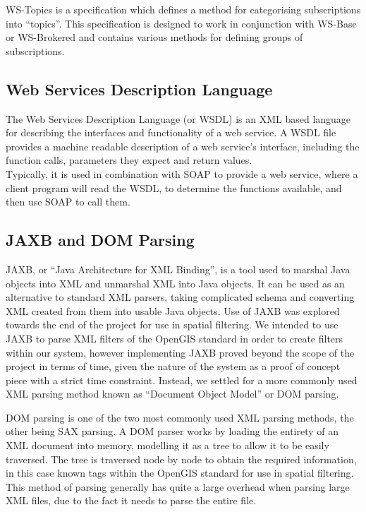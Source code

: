 \documentclass[a4paper, 12pt]{article}
\begin{document}
WS-Topics is a specification which defines a method for categorising subscriptions into ``topics''. This specification is designed to work in conjunction with WS-Base or WS-Brokered and contains various methods for defining groups of subscriptions.

\subsection{Web Services Description Language}

The Web Services Description Language (or WSDL) is an XML based language for describing the interfaces and functionality of a web service. A WSDL file provides a machine readable description of a web service's interface, including the function calls, parameters they expect and return values.\\
Typically, it is used in combination with SOAP to provide a web service, where a client program will read the WSDL, to determine the functions available, and then use SOAP to call them.

\subsection{JAXB and DOM Parsing}

JAXB, or ``Java Architecture for XML Binding'', is a tool used to marshal Java objects into XML and unmarshal XML into Java objects. It can be used as an alternative to standard XML parsers, taking complicated schema and converting XML created from them into usable Java objects. Use of JAXB was explored towards the end of the project for use in spatial filtering. We intended to use JAXB to parse XML filters of the OpenGIS standard in order to create filters within our system, however implementing JAXB proved beyond the scope of the project in terms of time, given the nature of the system as a proof of concept piece with a strict time constraint. Instead, we settled for a more commonly used XML parsing method known as ``Document Object Model'' or DOM parsing.

DOM parsing is one of the two most commonly used XML parsing methods, the other being SAX parsing. A DOM parser works by loading the entirety of an XML document into memory, modelling it as a tree to allow it to be easily traversed. The tree is traversed node by node to obtain the required information, in this case known tags within the OpenGIS standard for use in spatial filtering. This method of parsing generally has quite a large overhead when parsing large XML files, due to the fact it needs to parse the entire file.
\end{document}
